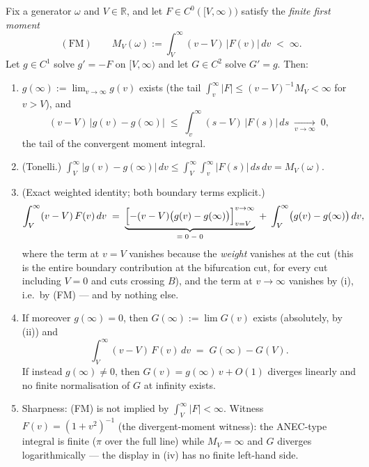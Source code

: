 \begin{lemma}
\label{lem:pair-tail}
Fix a generator $\omega$ and $V\in\mathbb{R}$, and let
$F\in C^{0}([V,\infty))$ satisfy the \emph{finite first moment}
\[
\mathrm{(FM)}\qquad
M_{V}(\omega):=\int_{V}^{\infty}(v-V)\,|F(v)|\,dv\;<\;\infty .
\]
Let $g\in C^{1}$ solve $g'=-F$ on $[V,\infty)$ and let $G\in C^{2}$
solve $G'=g$. Then:
\begin{enumerate}
\item[(i)] $g(\infty):=\lim_{v\to\infty}g(v)$ exists (the tail
$\int_{v}^{\infty}|F|\le (v-V)^{-1}M_{V}<\infty$ for $v>V$), and
\[
(v-V)\,\bigl|g(v)-g(\infty)\bigr|
\;\le\;\int_{v}^{\infty}(s-V)\,|F(s)|\,ds\;\xrightarrow[v\to\infty]{}\;0 ,
\]
the tail of the convergent moment integral.
\item[(ii)] (Tonelli.) $\displaystyle\int_{V}^{\infty}
\bigl|g(v)-g(\infty)\bigr|\,dv\le\int_{V}^{\infty}\!\!\int_{v}^{\infty}
|F(s)|\,ds\,dv=M_{V}(\omega)$.
\item[(iii)] (Exact weighted identity; both boundary terms explicit.)
\[
\int_{V}^{\infty}(v-V)\,F(v)\,dv
\;=\;\underbrace{\Bigl[-(v-V)\bigl(g(v)-g(\infty)\bigr)
\Bigr]_{v=V}^{v\to\infty}}_{\;=\;0\;-\;0\;}
\;+\;\int_{V}^{\infty}\bigl(g(v)-g(\infty)\bigr)\,dv ,
\]
where the term at $v=V$ vanishes because the \emph{weight} vanishes at
the cut (this is the entire boundary contribution at the bifurcation
cut, for every cut including $V=0$ and cuts crossing $B$), and the
term at $v\to\infty$ vanishes by (i), i.e.\ by (FM) --- and by nothing
else.
\item[(iv)] If moreover $g(\infty)=0$, then $G(\infty):=\lim G(v)$
exists (absolutely, by (ii)) and
\[
\int_{V}^{\infty}(v-V)\,F(v)\,dv\;=\;G(\infty)-G(V).
\]
If instead $g(\infty)\neq0$, then $G(v)=g(\infty)\,v+O(1)$ diverges
linearly and no finite normalisation of $G$ at infinity exists.
\item[(v)] Sharpness: (FM) is not implied by
$\int_{V}^{\infty}|F|<\infty$. Witness $F(v)=(1+v^{2})^{-1}$ (the
divergent-moment witness): the ANEC-type integral is finite ($\pi$ over the
full line) while $M_{V}=\infty$ and $G$ diverges logarithmically ---
the display in (iv) has no finite left-hand side.
\end{enumerate}
\end{lemma}


